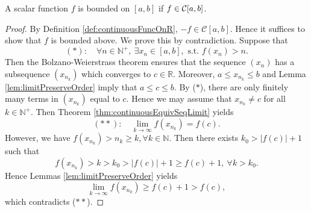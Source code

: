 \begin{thm}
  \label{thm:continuousImpliesBoundedness}
  A scalar function $f$ is bounded on $[a,b]$
   if $f\in {\cal C}[a,b]$.
\end{thm}
\begin{proof}
  By Definition \ref{def:continuousFuncOnR},
  $-f\in \mathcal{C}[a,b]$. Hence
  it suffices to show that $f$ is bounded above.
  We prove this by contradiction.
  Suppose that
  \begin{displaymath}
    (*):\quad
    \forall n\in \mathbb{N}^{+},\ \exists x_{n}\in [a,b],
    \text{ s.t. } f(x_{n})>n.
  \end{displaymath}
  Then the Bolzano-Weierstrass theorem
  ensures that the sequence $(x_{n})$ has a subsequence $(x_{n_{k}})$
  which converges to $c\in \mathbb{R}$. Moreover,
  $a\le x_{n_{k}}\le b$ and Lemma
  \ref{lem:limitPreserveOrder} imply that $a\le c\le b$.
  By ($\ast$), there are only finitely many terms in $(x_{n_{k}})$
  equal to $c$. Hence
  we may assume that $x_{n_{k}}\neq c$ for all $k\in \mathbb{N}^{+}$.
  Then Theorem \ref{thm:continuousEquivSeqLimit} yields
  \begin{displaymath}
    (**):\quad
    \lim_{k\rightarrow\infty}f(x_{n_{k}})=f(c).
  \end{displaymath}
  However, we have
  $f(x_{n_{k}})>n_{k}\ge k,\forall k\in \mathbb{N}$.
  Then there exists $k_{0}>|f(c)|+1$ such that
  \begin{displaymath}
    f(x_{n_{k}})>k>k_{0}>|f(c)|+1\ge f(c)+1,\ \forall k>k_{0}.
  \end{displaymath}
  Hence Lemmas \ref{lem:limitPreserveOrder} yields
  \begin{displaymath}
    \lim_{k\rightarrow\infty}f(x_{n_{k}})
  \ge f(c)+1>f(c),
  \end{displaymath}
  which contradicts ($\ast\ast$).
\end{proof}

